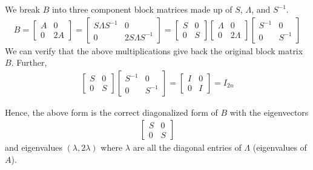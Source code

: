 \documentclass[../../../linear_algebra.tex]{subfiles}
\begin{document}
    We break $B$ into three component block matrices made up of $S$, $\Lambda$, and $S^{-1}$.
    \begin{align*}
        B = \begin{bmatrix}
            A &0\\ 0 &2A
        \end{bmatrix} =
        \begin{bmatrix}
            S\Lambda S^{-1} &0\\ 0 &2S\Lambda S^{-1}
        \end{bmatrix} =
        \begin{bmatrix}
            S &0\\ 0 &S
        \end{bmatrix}
        \begin{bmatrix}
            \Lambda &0\\ 0 &2\Lambda
        \end{bmatrix}
        \begin{bmatrix}
            S^{-1} &0\\ 0 &S^{-1}
        \end{bmatrix}
    \end{align*}
    We can verify that the above multiplications give back the original block matrix $B$. Further,
    \begin{align*}
        \begin{bmatrix}
            S &0\\ 0 &S
        \end{bmatrix}
        \begin{bmatrix}
            S^{-1} &0\\ 0 &S^{-1}
        \end{bmatrix} =
        \begin{bmatrix}
            I &0\\ 0 &I
        \end{bmatrix} = I_{2n}
    \end{align*}

    Hence, the above form is the correct diagonalized form of $B$ with the eigenvectors
    \begin{align*}
        \begin{bmatrix}
            S &0\\ 0 &S
        \end{bmatrix}
    \end{align*}
    and eigenvalues $(\lambda, 2\lambda)$ where $\lambda$ are all the diagonal entries of $\Lambda$ (eigenvalues of $A$).
\end{document}
